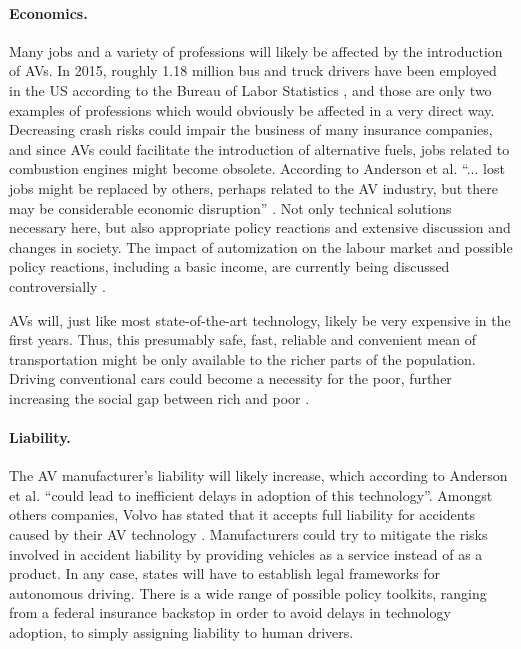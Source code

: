 \documentclass[11pt]{article}
\begin{document}
\paragraph{Economics.}
Many jobs and a variety of professions will likely be affected by the introduction of AVs. In 2015, roughly 1.18 million bus and truck drivers have been employed in the US according to the Bureau of Labor Statistics \cite{USLabourBureau2016}, and those are only two examples of professions which would obviously be affected in a very direct way. Decreasing crash risks could impair the business of many insurance companies, and since AVs could facilitate the introduction of alternative fuels, jobs related to combustion engines might become obsolete. According to Anderson et al. ``... lost jobs might be replaced by others, perhaps related to the AV industry, but there may be considerable economic disruption'' \cite[p. 40ff]{Anderson2014rand}. Not only technical solutions necessary here, but also appropriate policy reactions and extensive discussion and changes in society. The impact of automization on the labour market and possible policy reactions, including a basic income, are currently being discussed controversially \cite{VanDerVeen2002, Olsen2014}.

AVs will, just like most state-of-the-art technology, likely be very expensive in the first years. Thus, this presumably safe, fast, reliable and convenient mean of transportation might be only available to the richer parts of the population. Driving conventional cars could become a necessity for the poor, further increasing the social gap between rich and poor \cite[p. 39]{Anderson2014rand}.

\paragraph{Liability.}
The AV manufacturer's liability will likely increase, which according to Anderson et al. ``could lead to inefficient delays in adoption of this technology''. Amongst others companies, Volvo has stated that it accepts full liability for accidents caused by their AV technology \cite{HarrisVolvo2015}. Manufacturers could try to mitigate the risks involved in accident liability by providing vehicles as a service instead of as a product. In any case, states will have to establish legal frameworks for autonomous driving. There is a wide range of possible policy toolkits, ranging from a federal insurance backstop in order to avoid delays in technology adoption, to simply assigning liability to human drivers.
\end{document}
